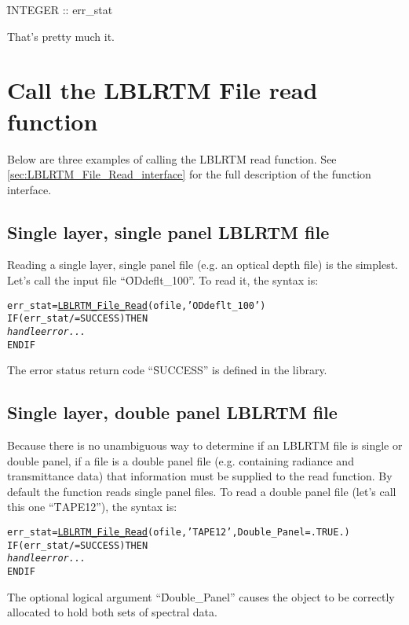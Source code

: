 \hspace{0.4cm}\f{INTEGER :: err\_stat}

That's pretty much it.



\section{Call the LBLRTM File read function}

Below are three examples of calling the LBLRTM \File{} read function. See \ref{sec:LBLRTM_File_Read_interface} for the full description of the function interface.

\subsection{Single layer, single panel LBLRTM file}
Reading a single layer, single panel file (e.g. an optical depth file) is the simplest. Let's call the input file ``\f{ODdeflt\_100}''. To read it, the syntax is:
\begin{alltt}
  err_stat = \hyperref[sec:LBLRTM_File_Read_interface]{LBLRTM_File_Read}(ofile, 'ODdeflt_100')
  IF ( err_stat /= SUCCESS ) THEN
    \textrm{\textit{handle error...}}
  END IF\end{alltt}
The error status return code ``\f{SUCCESS}'' is defined in the library.


\subsection{Single layer, double panel LBLRTM file}
Because there is no unambiguous way to determine if an LBLRTM file is single or double panel, if a file is a double panel file (e.g. containing radiance and transmittance data) that information must be supplied to the read function. By default the function reads single panel files. To read a double panel file (let's call this one ``\f{TAPE12}''), the syntax is:
\begin{alltt}
  err_stat = \hyperref[sec:LBLRTM_File_Read_interface]{LBLRTM_File_Read}(ofile, 'TAPE12', Double_Panel=.TRUE.)
  IF ( err_stat /= SUCCESS ) THEN
    \textrm{\textit{handle error...}}
  END IF\end{alltt}

The optional logical argument ``\f{Double\_Panel}'' causes the \File{} object to be correctly allocated to hold both sets of spectral data.


